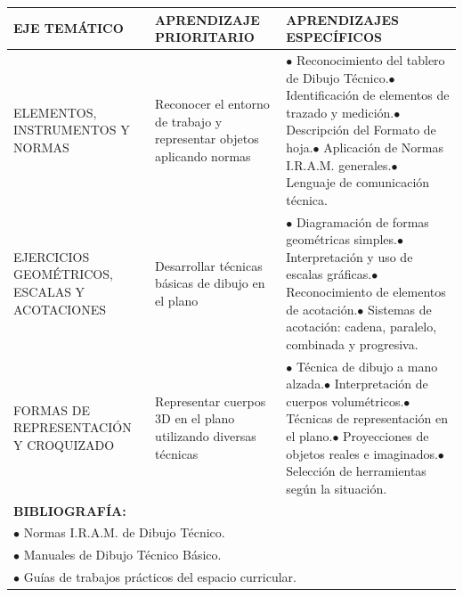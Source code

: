 \documentclass[a4paper,landscape]{article}
\begin{document}
\begin{center}
\begin{tabularx}{0.98\textwidth}{|p{4cm}|p{6cm}|X|}
\hline
\rowcolor{gray!20}\fontsize{10pt}{12pt}\selectfont\bfseries EJE TEMÁTICO & \textbf{APRENDIZAJE PRIORITARIO} & \textbf{APRENDIZAJES ESPECÍFICOS} \\ \hline
\fontsize{10pt}{12pt}\selectfont ELEMENTOS, INSTRUMENTOS Y NORMAS & Reconocer el entorno de trabajo y representar objetos aplicando normas & $\bullet$ Reconocimiento del tablero de Dibujo Técnico.\newline $\bullet$ Identificación de elementos de trazado y medición.\newline $\bullet$ Descripción del Formato de hoja.\newline $\bullet$ Aplicación de Normas I.R.A.M. generales.\newline $\bullet$ Lenguaje de comunicación técnica. \\ \hline
\fontsize{10pt}{12pt}\selectfont EJERCICIOS GEOMÉTRICOS, ESCALAS Y ACOTACIONES & Desarrollar técnicas básicas de dibujo en el plano & $\bullet$ Diagramación de formas geométricas simples.\newline $\bullet$ Interpretación y uso de escalas gráficas.\newline $\bullet$ Reconocimiento de elementos de acotación.\newline $\bullet$ Sistemas de acotación: cadena, paralelo, combinada y progresiva. \\ \hline
\fontsize{10pt}{12pt}\selectfont FORMAS DE REPRESENTACIÓN Y CROQUIZADO & Representar cuerpos 3D en el plano utilizando diversas técnicas & $\bullet$ Técnica de dibujo a mano alzada.\newline $\bullet$ Interpretación de cuerpos volumétricos.\newline $\bullet$ Técnicas de representación en el plano.\newline $\bullet$ Proyecciones de objetos reales e imaginados.\newline $\bullet$ Selección de herramientas según la situación. \\ \hline
\multicolumn{3}{|l|}{\textbf{BIBLIOGRAFÍA:}} \\ \hline
\multicolumn{3}{|l|}{$\bullet$ Normas I.R.A.M. de Dibujo Técnico.} \\ \hline
\multicolumn{3}{|l|}{$\bullet$ Manuales de Dibujo Técnico Básico.} \\ \hline
\multicolumn{3}{|l|}{$\bullet$ Guías de trabajos prácticos del espacio curricular.} \\ \hline
\end{tabularx}
\end{center}
\end{document}
